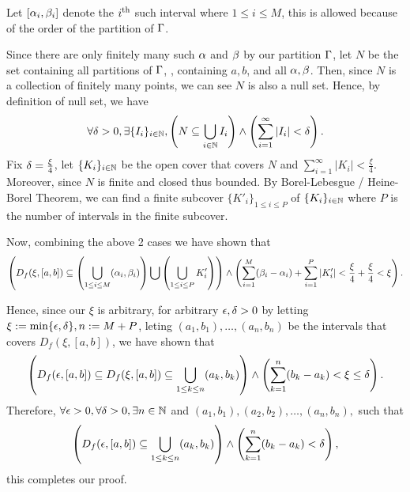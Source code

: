 \documentclass[12pt, sepia, brown, 0.5in]{alittlebear}
\begin{document}
{\begin{proofcases}
{            Let $[\alpha_i,\beta_i]$ denote the $i^{\text{th}}$ such interval where $1\leq i\leq M$, this is allowed because of the order of the partition of $\Gamma$.
        }
          
    \end{proofcases}

    Since there are only finitely many such $\alpha$ and $\beta$ by our partition $\Gamma$, let $N$ be the set containing all partitions of $\Gamma$, \ie, containing $a,b$, and all $\alpha,\beta$. Then, since $N$ is a collection of finitely many points, we can see $N$ is also a null set. Hence, by definition of null set, we have \[\forall \delta >0, \exists\{I_i\}_{i\in\mathbb{N}}, \left(N\subseteq\bigcup_{i\in\mathbb{N}}I_i\right)\land\left(\sum_{i=1}^\infty\left|I_i\right|<\delta\right).\] Fix $\delta=\frac{\xi}{4}$, let $\{K_i\}_{i\in\mathbb{N}}$ be the open cover that covers $N$ and $\sum_{i=1}^\infty |K_i|<\frac{\xi}{4}$. Moreover, since $N$ is finite and closed thus bounded. By Borel-Lebesgue / Heine-Borel Theorem, we can find a finite subcover $\{K'_i\}_{1\leq i\leq P}$ of $\{K_i\}_{i\in\mathbb{N}}$ where $P$ is the number of intervals in the finite subcover.
    
    Now, combining the above 2 cases we have shown that \[\left(D_f(\xi,[a,b])\subseteq\left(\bigcup_{1\leq i\leq M}(\alpha_i,\beta_i)\right)\bigcup\left(\bigcup_{1\leq i\leq P}K'_i\right)\right)\land\left(\sum_{i=1}^M(\beta_i-\alpha_i)+\sum_{i=1}^P\left|K'_i\right|<\frac{\xi}{4}+\frac{\xi}{4}<\xi\right).\] 
    
    Hence, since our $\xi$ is arbitrary, for arbitrary $\epsilon,\delta>0$ by letting $\xi:=\min\{\epsilon,\delta\}, n:=M+P$, leting $(a_1,b_1),\ldots,(a_{n},b_{n})$ be the intervals that covers $D_f(\xi,[a,b])$, we have shown that \[\left(D_f(\epsilon,[a,b])\subseteq D_f(\xi,[a,b])\subseteq \bigcup_{1\leq k\leq n}(a_k,b_k)\right)\land\left(\sum_{k=1}^n(b_k-a_k)<\xi\leq\delta\right).\] Therefore, $\forall \epsilon >0, \forall\delta>0,\exists n\in \mathbb{N}$ and $(a_1,b_1), (a_2,b_2),\ldots,(a_n,b_n),$ such that \[\left(D_{f}(\epsilon,[a,b])\subseteq\bigcup_{1\leq k\leq n}(a_k,b_k)\right)\land\left(\sum_{k=1}^{n}(b_k-a_k)<\delta\right),\] this completes our proof. 
}
\end{document}
